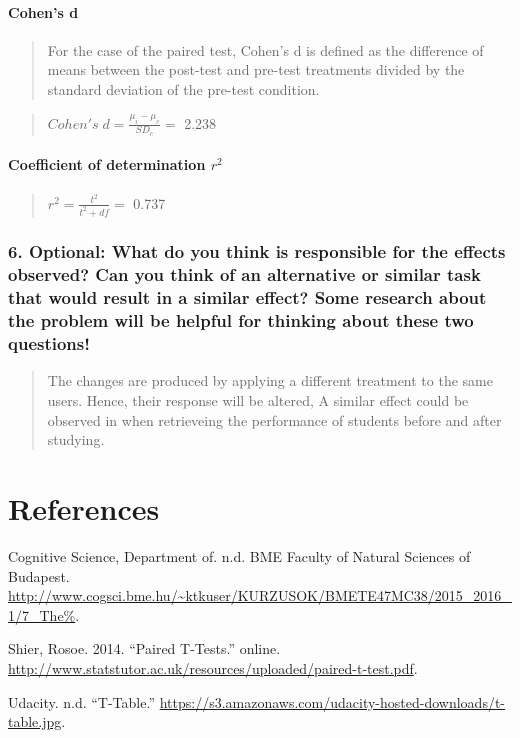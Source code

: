 \documentclass[]{article}
\let\oldparagraph\paragraph
\renewcommand{\paragraph}[1]{\oldparagraph{#1}\mbox{}}
\begin{document}
\paragraph{\texorpdfstring{\textbf{Cohen's
d}}{Cohen's d}}\label{cohens-d}

\begin{quote}
For the case of the paired test, Cohen's d is defined as the difference
of means between the post-test and pre-test treatments divided by the
standard deviation of the pre-test condition.
\end{quote}

\begin{quote}
\(Cohen's\; d= \frac{\mu_i-\mu_c}{SD_c}=\) 2.238
\end{quote}

\paragraph{\texorpdfstring{\textbf{Coefficient of determination
\(r^2\)}}{Coefficient of determination r\^{}2}}\label{coefficient-of-determination-r2}

\begin{quote}
\(r^2= \frac{t^2}{t^2+df}=\) 0.737
\end{quote}

\subsubsection{6. Optional: What do you think is responsible for the
effects observed? Can you think of an alternative or similar task that
would result in a similar effect? Some research about the problem will
be helpful for thinking about these two
questions!}\label{optional-what-do-you-think-is-responsible-for-the-effects-observed-can-you-think-of-an-alternative-or-similar-task-that-would-result-in-a-similar-effect-some-research-about-the-problem-will-be-helpful-for-thinking-about-these-two-questions}

\begin{quote}
The changes are produced by applying a different treatment to the same
users. Hence, their response will be altered, A similar effect could be
observed in when retrieveing the performance of students before and
after studying.
\end{quote}

\section*{References}\label{references}

\hypertarget{refs}{}
\hypertarget{ref-slides_t_test}{}
Cognitive Science, Department of. n.d. BME Faculty of Natural Sciences
of Budapest.
\url{http://www.cogsci.bme.hu/~ktkuser/KURZUSOK/BMETE47MC38/2015_2016_1/7_The\%}.

\hypertarget{ref-stanford_t_test}{}
Shier, Rosoe. 2014. ``Paired T-Tests.'' online.
\url{http://www.statstutor.ac.uk/resources/uploaded/paired-t-test.pdf}.

\hypertarget{ref-t-table}{}
Udacity. n.d. ``T-Table.''
\url{https://s3.amazonaws.com/udacity-hosted-downloads/t-table.jpg}.
\end{document}
